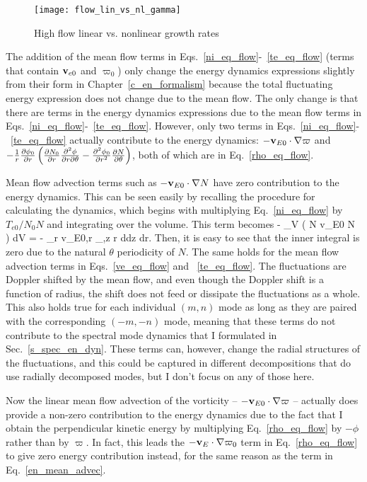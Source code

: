 \begin{figure}
\centerline{\texttt{[image: flow\_lin\_vs\_nl\_gamma]}}
\caption{High flow linear vs. nonlinear growth rates}
\label{flow_lin_vs_nl_gamma}
\end{figure}

The addition of the mean flow terms in Eqs.~\ref{ni_eq_flow}-~\ref{te_eq_flow} (terms that contain ${\bf v}_{e0}$ and $\varpi_0$) only change the energy dynamics expressions slightly
from their form in Chapter~\ref{c_en_formalism} because the total fluctuating energy expression does not change due to the mean flow. The only change is that there are terms in
the energy dynamics expressions due to the mean flow terms in Eqs.~\ref{ni_eq_flow}-~\ref{te_eq_flow}. However, only two terms in Eqs.~\ref{ni_eq_flow}-~\ref{te_eq_flow} actually
contribute to the energy dynamics: $- {\mathbf v_{E0}} \cdot \nabla \varpi$ and 
$-\frac{1}{r} \frac{\partial\phi_0}{\partial r} \left(\frac{\partial N_0}{\partial r} \frac{\partial^2\phi}{\partial r \partial\theta} - \frac{\partial^2\phi_0}{\partial r^2} \frac{\partial N}{\partial\theta} \right) \nonumber$, both of which are in Eq.~\ref{rho_eq_flow}.

Mean flow advection terms such as $- {\mathbf v_{E0}} \cdot \nabla N$ have zero contribution to the energy dynamics. This can be seen easily by recalling the procedure for calculating
the dynamics, which begins with multiplying Eq.~\ref{ni_eq_flow} by $T_{e0}/N_0 N$ and integrating over the volume. This term becomes
\beq
\label{en_mean_advec}
- \int_V \left(  N {\mathbf v_{E0}} \cdot \grad N \right) dV = -  \int_r {\mathbf v_{E0,r}}  \int_{\theta,z}  r d\theta dz dr.
\eeq
Then, it is easy to see that the inner integral is zero due to the natural $\theta$ periodicity of $N$. The same holds for the mean flow advection terms in Eqs.~\ref{ve_eq_flow} and
~\ref{te_eq_flow}. The fluctuations are Doppler shifted by the mean flow, and even though the Doppler shift is a function of radius, the shift does not feed or dissipate the fluctuations
as a whole. This also holds true for each individual $(m,n)$ mode as long as they are paired with the corresponding $(-m,-n)$ mode, meaning that these terms do not contribute to
the spectral mode dynamics that I formulated in Sec.~\ref{s_spec_en_dyn}. 
These terms can, however, change the radial structures of the fluctuations, and this could be captured in different decompositions that do use radially decomposed modes,
but I don't focus on any of those here.

Now the linear mean flow advection of the vorticity -- $- {\mathbf v_{E0}} \cdot \nabla \varpi$ -- 
actually does provide a non-zero contribution to the energy dynamics due to the fact that I obtain
the perpendicular kinetic energy by multiplying Eq.~\ref{rho_eq_flow} by $-\phi$ rather than by $\varpi$. In fact, this leads the $- {\mathbf v_{E}} \cdot \nabla \varpi_0$ term in Eq.~\ref{rho_eq_flow}
to give zero energy contribution instead, for the same reason as the term in Eq.~\ref{en_mean_advec}.


